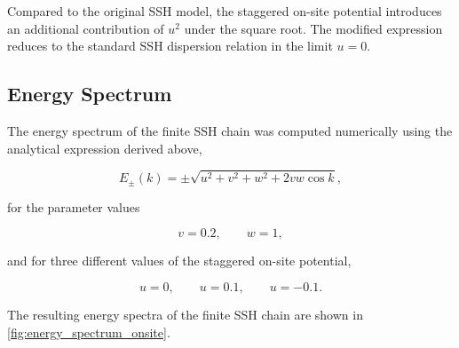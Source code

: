 \documentclass[11pt, a4paper]{article}
\begin{document}
Compared to the original SSH model, the staggered on-site potential
introduces an additional contribution of $u^2$ under the square root.
The modified expression reduces to the standard SSH dispersion relation in
the limit $u=0$.

\subsection{Energy Spectrum}

The energy spectrum of the finite SSH chain was computed numerically using
the analytical expression derived above,

\[
E_{\pm}(k)
=
\pm
\sqrt{
u^2
+
v^2
+
w^2
+
2vw\cos k
},
\]

for the parameter values

\[
v=0.2,\qquad
w=1,
\]

and for three different values of the staggered on-site potential,

\[
u=0,\qquad
u=0.1,\qquad
u=-0.1.
\]

The resulting energy spectra of the finite SSH chain are shown in
\cref{fig:energy_spectrum_onsite}.
\end{document}
